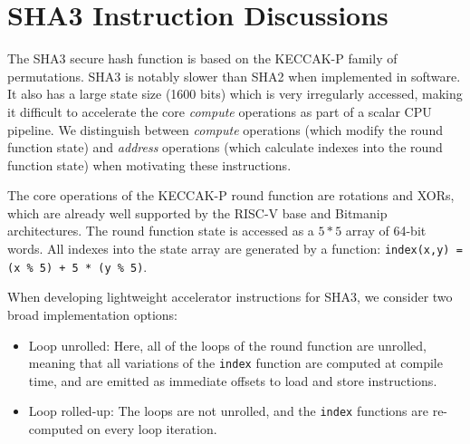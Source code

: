 
\section{SHA3 Instruction Discussions}
\label{sec:appendix:sha3}

The SHA3 secure hash function \cite{nist:fips:202} is based on
the KECCAK-P family of permutations.
SHA3 is notably slower than SHA2 when implemented in software.
It also has a large state size (1600 bits) which is very irregularly
accessed, making it difficult to accelerate
the core {\em compute} operations as part of a scalar CPU pipeline.
We distinguish between {\em compute} operations (which modify the
round function state) and {\em address} operations (which calculate
indexes into the round function state) when motivating these instructions.

The core operations of the KECCAK-P round function are rotations
and XORs, which are already well supported by the RISC-V
base and Bitmanip architectures.
The round function state is accessed as a $5*5$ array of
64-bit words.
All indexes into the state array are generated by a function:
\lstinline{index(x,y) = (x % 5) + 5 * (y % 5)}.

When developing lightweight accelerator instructions for SHA3, we
consider two broad implementation options:
\begin{itemize}
\item Loop unrolled: Here, all of the loops of the round function are
    unrolled, meaning that all variations of the \lstinline{index}
    function are computed at compile time, and are emitted as immediate
    offsets to load and store instructions.
\item Loop rolled-up: The loops are not unrolled, and the
    \lstinline{index} functions are re-computed on every loop iteration.
\end{itemize}

